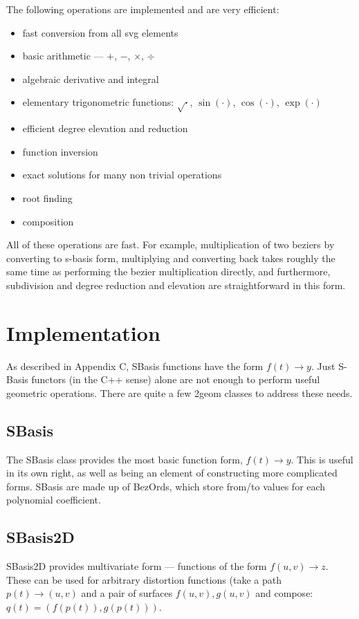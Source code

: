 \documentclass[openany]{book}
\newcommand{\code}[1]{\textsf{#1}}
\begin{document}
The following operations are implemented and are very efficient:
\begin{itemize}
\item fast conversion from all svg elements
\item basic arithmetic --- $+$, $-$, $\times$, $\div$
\item algebraic derivative and integral
\item elementary trigonometric functions: $\sqrt{\cdot}$, $\sin(\cdot)$, $\cos(\cdot)$, $\exp(\cdot)$
\item efficient degree elevation and reduction
\item function inversion
\item exact solutions for many non trivial operations
\item root finding
\item composition
\end{itemize}

All of these operations are fast.  For example, multiplication of two
beziers by converting to s-basis form, multiplying and converting back
takes roughly the same time as performing the bezier multiplication
directly, and furthermore, subdivision and degree reduction and
elevation are straightforward in this form.

\section{Implementation}
As described in Appendix C, SBasis functions have the form $f(t) \rightarrow y$.
Just S-Basis functors (in the C++ sense) alone are not enough to perform
useful geometric operations.  There are quite a few 2geom classes to
address these needs.

\subsection{SBasis}
The \code{SBasis} class provides the most basic function form,
$f(t) \rightarrow y$.  This is useful in its own right, as well as being an
element of constructing more complicated forms.  \code{SBasis} are made
up of \code{BezOrd}s, which store from/to values for each polynomial
coefficient.

\subsection{SBasis2D}
SBasis2D provides multivariate form --- functions of the form
$f(u,v) \rightarrow z$.  These can be used for arbitrary distortion
functions (take a path $p(t) \rightarrow (u,v)$ and a pair of surfaces
$f(u,v),g(u,v)$ and compose: $q(t) = (f(p(t)), g(p(t)))$.
\end{document}
